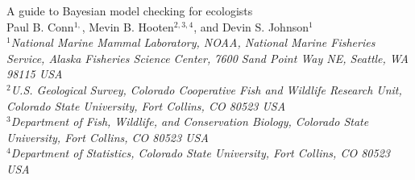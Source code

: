 \documentclass[12pt,english]{article}
\begin{document}
\begin{spacing}{1.9}


\begin{center}
A guide to Bayesian model checking for ecologists
\bigskip\\
\normalsize
{\sc Paul B. Conn$^{1,}$\footnotemark[5], Mevin B. Hooten$^{2,3,4}$, and
Devin S. Johnson$^1$ }\smallskip\\
$^1${\em National Marine Mammal Laboratory, NOAA, National Marine Fisheries Service,
Alaska Fisheries Science Center, 7600 Sand Point Way NE, Seattle,
WA 98115 USA }\\ \medskip
$^2${\em U.S. Geological Survey, Colorado Cooperative Fish and Wildlife Research Unit, Colorado State University, Fort Collins, CO 80523 USA }\\ \medskip
$^3${\em Department of Fish, Wildlife, and Conservation Biology, Colorado State University, Fort Collins, CO 80523 USA }\\ \medskip
$^4${\em Department of Statistics, Colorado State University, Fort Collins, CO 80523 USA }\\ \medskip
\end{center}


\raggedright \setlength{\parindent}{0.3in}
{}

\linenumbers


\end{spacing}
\end{document}
